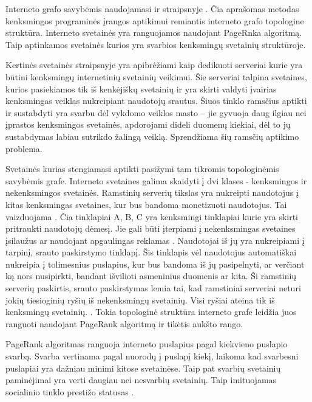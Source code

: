 Interneto grafo savybėmis naudojamasi ir straipsnyje . Čia aprašomas metodas kenksmingos programinės įrangos aptikimui remiantis interneto grafo topologine struktūra. Interneto svetainės yra ranguojamos naudojant PageRnka algoritmą. Taip aptinkamos svetainės kurios yra svarbios kenksmingų svetainių struktūroje.

Kertinės svetainės straipsnyje \cite{linchpins} yra apibrėžiami kaip dedikuoti serveriai kurie yra būtini kenksmingų internetinių svetainių veikimui. Šie serveriai talpina svetaines, kurios pasiekiamos tik iš kenkėjiškų svetainių ir yra skirti valdyti įvairias kenksmingas veiklas nukreipiant naudotojų srautus. Šiuos tinklo ramsčius aptikti ir sustabdyti yra svarbu dėl vykdomo veiklos masto -- jie gyvuoja daug ilgiau nei įprastos kenksmingos svetainės, apdorojami dideli duomenų kiekiai, dėl to jų sustabdymas labiau sutrikdo žalingą veiklą. Sprendžiama šių ramsčių aptikimo problema.

Svetainės kurias stengiamasi aptikti pasižymi tam tikromis topologinėmis savybėmis grafe. Interneto svetaines galima skaidyti į dvi klases - kenksmingos ir nekenksmingos svetainės. Ramstinių serverių tikslas yra nukreipti naudotojus į kitas kenksmingas svetaines, kur bus bandoma monetizuoti naudotojus. Tai vaizduojama . Čia tinklapiai A, B, C yra kenksmingi tinklapiai kurie yra skirti pritraukti naudotojų dėmesį. Jie gali būti įterpiami į nekenksmingas svetaines įsilaužus ar naudojant apgaulingas reklamas \cite{tax}. Naudotojai iš jų yra nukreipiami į tarpinį, srauto paskirstymo tinklapį. Šis tinklapis vėl naudotojus automatiškai nukreipia į tolimesnius puslapius, kur bus bandoma iš jų pasipelnyti, ar verčiant ką nors nusipirkti, bandant išvilioti asmeninius duomenis ar kita. Ši ramstinių serverių paskirtis, srauto paskirstymas lemia tai, kad ramstiniai serveriai neturi jokių tiesioginių ryšių iš nekenksmingų svetainių. Visi ryšiai ateina tik iš kenksmingų svetainių. \cite{linchpins}. Tokia topologinė struktūra interneto grafe leidžia juos ranguoti naudojant PageRank algoritmą ir tikėtis aukšto rango.


PageRank algoritmas ranguoja interneto puslapius pagal kiekvieno puslapio svarbą. Svarba vertinama pagal nuorodų į puslapį kiekį, laikoma kad svarbesni puslapiai yra dažniau minimi kitose svetainėse. Taip pat svarbių svetainių paminėjimai yra verti daugiau nei nesvarbių svetainių. Taip imituojamas socialinio tinklo prestižo statusas \cite{Wu2008}.

